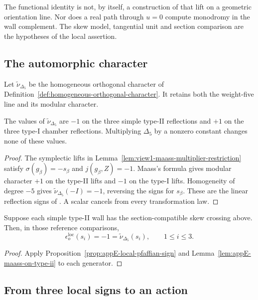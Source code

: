 The functional identity is not, by itself, a construction of that
lift on a geometric orientation line. Nor does a real path through
\(u=0\) compute monodromy in the wall complement. The skew model,
tangential unit and section comparison are the hypotheses of the
local assertion.

\subsection{The automorphic character}
\label{app:pfaffian-wall-maass-match}

Let \(\widetilde\nu_{\Delta_5}\) be the homogeneous orthogonal
character of Definition~\ref{def:homogeneous-orthogonal-character}.
It retains both the weight-five line and its modular character.

\begin{lemma}
\label{lem:appE-maass-on-type-ii}
The values of \(\widetilde\nu_{\Delta_5}\) are \(-1\) on the
three simple type-II reflections and \(+1\) on the three type-I
chamber reflections. Multiplying \(\Delta_5\) by a nonzero constant
changes none of these values.
\end{lemma}
\begin{proof}
The symplectic lifts in
Lemma~\ref{lem:view1-maass-multiplier-restriction} satisfy
\(\sigma(g_\beta)=-s_\beta\) and
\(j(g_\beta,Z)=-1\). Maass's formula
\cite[(1.5)]{GN} gives modular character \(+1\) on the type-II
lifts and \(-1\) on the type-I lifts. Homogeneity of degree
\(-5\) gives
\(\widetilde\nu_{\Delta_5}(-I)=-1\), reversing the signs for
\(s_\beta\). These are the linear reflection signs of
\cite[Proposition 2.1]{GN}. A scalar cancels from every
transformation law.
\end{proof}

\begin{theorem}
\label{thm:appE-local-orientation-match}
Suppose each simple type-II wall has the section-compatible skew
crossing above. Then, in those reference comparisons,
\[
 \epsilon_o^{\mathrm{loc}}(s_i)=-1
       =\widetilde\nu_{\Delta_5}(s_i),\qquad 1\le i\le3.
\]
\end{theorem}
\begin{proof}
Apply Proposition~\ref{prop:appE-local-pfaffian-sign} and
Lemma~\ref{lem:appE-maass-on-type-ii} to each generator.
\end{proof}

\subsection{From three local signs to an action}
\label{app:pfaffian-wall-W2-extension}

